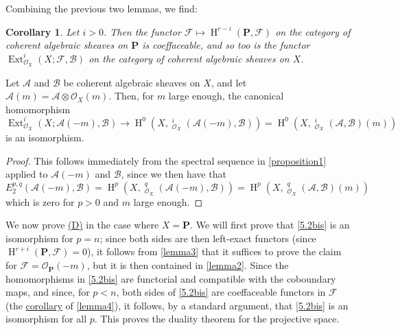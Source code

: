 \documentclass{article}
\theoremstyle{plain}
\newenvironment{lemma}[1]
  {\renewcommand\theinnercustomlemma{#1}\innercustomlemma}
  {\endinnercustomlemma}
\newtheorem*{corollary*}{Corollary}
\theoremstyle{definition}
\newcommand{\sh}[1]{{\mathscr{#1}}}
\newcommand{\bb}{\mathbf}
\DeclareMathOperator{\Ext}{Ext}
\DeclareMathOperator{\shExt}{\underline{Ext}}
\DeclareMathOperator{\HH}{H}
\newcommand{\oldpage}[1]{\marginpar{\footnotesize$\Big\vert$ \textit{p.~#1}}}
\begin{document}
Combining the previous two lemmas, we find:

\begin{corollary*}
\label{lemma3andlemma4corollary}
  Let $i>0$.
  Then the functor $\sh{F}\mapsto\HH^{r-i}(\bb{P},\sh{F})$ on the category of coherent algebraic sheaves on $\bb{P}$ is coeffaceable, and so too is the functor $\Ext_{\sh{O}_X}^i(X;\sh{F},\sh{B})$ on the category of coherent algebraic sheaves on $X$.
\end{corollary*}

\oldpage{149-16}
\begin{lemma}{5}
\label{lemma5}
  Let $\sh{A}$ and $\sh{B}$ be coherent algebraic sheaves on $X$, and let $\sh{A}(m)=\sh{A}\otimes\sh{O}_X(m)$.
  Then, for $m$ large enough, the canonical homomorphism
  \[
    \Ext_{\sh{O}_X}^i(X;\sh{A}(-m),\sh{B})
    \to \HH^0(X,\shExt_{\sh{O}_X}^i(\sh{A}(-m),\sh{B}))
    = \HH^0(X,\shExt_{\sh{O}_X}^i(\sh{A},\sh{B})(m))
  \]
  is an isomorphism.
\end{lemma}

\begin{proof}
  This follows immediately from the spectral sequence in \cref{proposition1} applied to $\sh{A}(-m)$ and $\sh{B}$, since we then have that
  \[
    E_2^{p,q}(\sh{A}(-m),\sh{B})
    = \HH^p(X,\shExt_{\sh{O}_X}^q(\sh{A}(-m),\sh{B}))
    = \HH^p(X,\shExt_{\sh{O}_X}^q(\sh{A},\sh{B})(m))
  \]
  which is zero for $p>0$ and $m$ large enough.
\end{proof}

We now prove \hyperref[(D)]{(D)} in the case where $X=\bb{P}$.
We will first prove that \cref{5.2bis} is an isomorphism for $p=n$;
since both sides are then left-exact functors (since $\HH^{r+i}(\bb{P},\sh{F})=0$), it follows from \cref{lemma3} that it suffices to prove the claim for $\sh{F}=\sh{O}_\bb{P}(-m)$, but it is then contained in \cref{lemma2}.
Since the homomorphisms in \cref{5.2bis} are functorial and compatible with the coboundary maps, and since, for $p<n$, both sides of \cref{5.2bis} are coeffaceable functors in $\sh{F}$ (the \hyperref[lemma3andlemma4corollary]{corollary} of \cref{lemma4}), it follows, by a standard argument, that \cref{5.2bis} is an isomorphism for all $p$.
This proves the duality theorem for the projective space.
\end{document}
